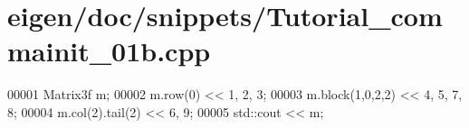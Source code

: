 \hypertarget{eigen_2doc_2snippets_2_tutorial__commainit__01b_8cpp_source}{}\section{eigen/doc/snippets/\+Tutorial\+\_\+commainit\+\_\+01b.cpp}
\label{eigen_2doc_2snippets_2_tutorial__commainit__01b_8cpp_source}

\begin{DoxyCode}
00001 Matrix3f m;
00002 m.row(0) << 1, 2, 3;
00003 m.block(1,0,2,2) << 4, 5, 7, 8;
00004 m.col(2).tail(2) << 6, 9;           
00005 std::cout << m;
\end{DoxyCode}
